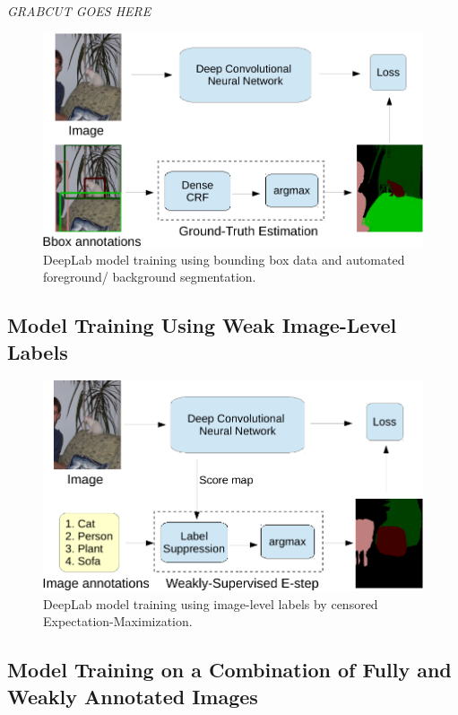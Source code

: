 \emph{GRABCUT GOES HERE}

\begin{figure}[htbp!]
  \centering
  \includegraphics[width=0.9\linewidth]{fig/model_train_bbox.pdf} 
  \caption{DeepLab model training using bounding box data and
    automated foreground/ background segmentation.}
  \label{fig:model_train_bbox}
\end{figure}


\subsection{Model Training Using Weak Image-Level Labels}



\begin{figure}[htbp!]
  \centering
  \includegraphics[width=0.9\linewidth]{fig/model_train_image.pdf} 
  \caption{DeepLab model training using image-level labels by
    censored Expectation-Maximization.}
  \label{fig:model_train_image}
\end{figure}

\subsection{Model Training on a Combination of Fully and Weakly Annotated Images}

